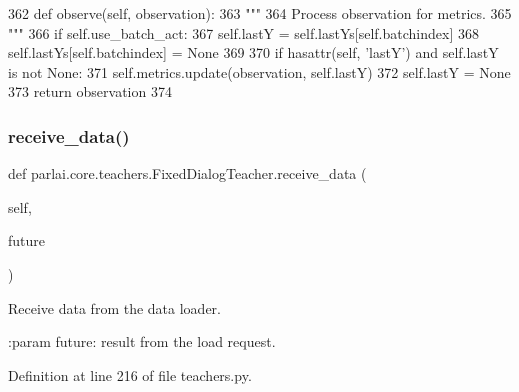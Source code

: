 \begin{DoxyCode}
362     \textcolor{keyword}{def }observe(self, observation):
363         \textcolor{stringliteral}{"""}
364 \textcolor{stringliteral}{        Process observation for metrics.}
365 \textcolor{stringliteral}{        """}
366         \textcolor{keywordflow}{if} self.use\_batch\_act:
367             self.lastY = self.lastYs[self.batchindex]
368             self.lastYs[self.batchindex] = \textcolor{keywordtype}{None}
369 
370         \textcolor{keywordflow}{if} hasattr(self, \textcolor{stringliteral}{'lastY'}) \textcolor{keywordflow}{and} self.lastY \textcolor{keywordflow}{is} \textcolor{keywordflow}{not} \textcolor{keywordtype}{None}:
371             self.metrics.update(observation, self.lastY)
372             self.lastY = \textcolor{keywordtype}{None}
373         \textcolor{keywordflow}{return} observation
374 
\end{DoxyCode}
\mbox{\label{classparlai_1_1core_1_1teachers_1_1FixedDialogTeacher_a001ed7924490d0e291588c54d383384a}} 
\subsubsection{\texorpdfstring{receive\+\_\+data()}{receive\_data()}}
{\footnotesize\ttfamily def parlai.\+core.\+teachers.\+Fixed\+Dialog\+Teacher.\+receive\+\_\+data (\begin{DoxyParamCaption}\item[{}]{self,  }\item[{}]{future }\end{DoxyParamCaption})}

\begin{DoxyVerb}Receive data from the data loader.

:param future: result from the load request.
\end{DoxyVerb}
 

Definition at line 216 of file teachers.\+py.


